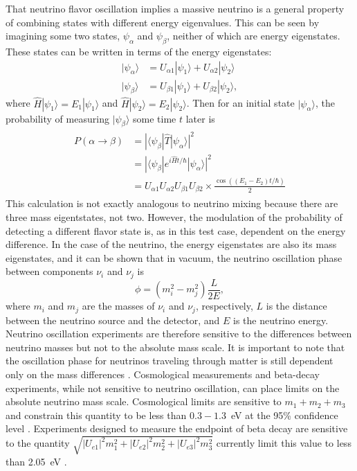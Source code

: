 That neutrino flavor oscillation implies a massive neutrino is a general property of combining states with different energy eigenvalues.  This can be seen by imagining some two states, $\psi_{\alpha}$ and $\psi_{\beta}$, neither of which are energy eigenstates.  These states can be written in terms of the energy eigenstates: 
\begin{align}
|\psi_{\alpha}\rangle &= U_{\alpha 1}|\psi_1\rangle + U_{\alpha 2}|\psi_2\rangle \\
|\psi_{\beta}\rangle &= U_{{\beta}1}|\psi_1\rangle + U_{{\beta}2}|\psi_2\rangle, 
\end{align}
where $\hat{H}|\psi_1\rangle = E_1|\psi_1\rangle$ and $\hat{H}|\psi_2\rangle = E_2|\psi_2\rangle$.  Then for an initial state $|\psi_{\alpha}\rangle$, the probability of measuring $|\psi_{\beta}\rangle$ some time $t$ later is
\begin{align}
\begin{split}
P(\alpha\rightarrow\beta) &=  |\langle\psi_{\beta}|\hat{T}|\psi_{\alpha}\rangle|^2 \\
                             &=  |\langle\psi_{\beta}|e^{i\hat{H}t / \hbar}|\psi_{\alpha}\rangle|^2 \\
                             &=  U_{{\alpha}1}U_{{\alpha}2}U_{{\beta}1}U_{{\beta}2} \times \frac{\cos((E_1 - E_2)t/\hbar)}{2} 
\end{split}
\end{align}
This calculation is not exactly analogous to neutrino mixing because there are three mass eigentstates, not two.  However, the modulation of the probability of detecting a different flavor state is, as in this test case, dependent on the energy difference.  In the case of the neutrino, the energy eigenstates are also its mass eigenstates, and it can be shown that in vacuum, the neutrino oscillation phase between components $\nu_i$ and $\nu_j$ is \citep{PDG,neutrinoOscillations}
\begin{equation}
\phi = (m_i^2 - m_j^2)\frac{L}{2E},
\end{equation}
where $m_i$ and $m_j$ are the masses of $\nu_i$ and $\nu_j$, respectively, $L$ is the distance between the neutrino source and the detector, and $E$ is the neutrino energy.  Neutrino oscillation experiments are therefore sensitive to the differences between neutrino masses but not to the absolute mass scale.  It is important to note that the oscillation phase for neutrinos traveling through matter is still dependent only on the mass differences \citep{MSW}.  Cosmological measurements and beta-decay experiments, while not sensitive to neutrino oscillation, can place limits on the absolute neutrino mass scale.  Cosmological limits are sensitive to $m_1+m_2+m_3$ and constrain this quantity to be less than $0.3-1.3$~eV at the 95\% confidence level \citep{cosmoNuMassLimit}.  Experiments designed to measure the endpoint of beta decay are sensitive to the quantity $\sqrt{|U_{e1}|^2m_1^2 + |U_{e2}|^2m_2^2 + |U_{e3}|^2m_3^2}$ currently limit this value to less than 2.05~eV \citep{tritiumEndpoint}. 

